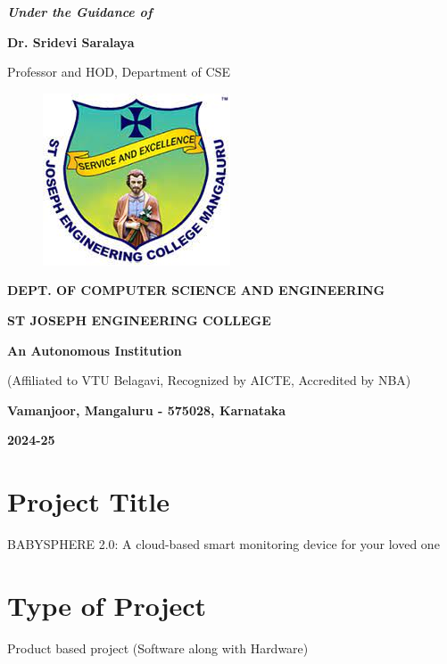 \documentclass[12pt,a4paper]{report}
\begin{document}
\begin{center}
\vspace{12pt}
\textit{\textbf{Under the Guidance of}}
\par
\vspace{6pt}
\textbf{Dr. Sridevi Saralaya}
\par
\vspace{2pt}
\normalsize { Professor and HOD, Department of CSE }
\par
\begin{figure}[hbtp]
\centering
\includegraphics[scale=0.6]{./pic/sjeclogo}
\end{figure}
\large \textbf{DEPT. OF COMPUTER SCIENCE AND ENGINEERING}
\par \Large \textbf{ST JOSEPH ENGINEERING COLLEGE}
\par 
\textbf{An Autonomous Institution}
\par
{\large{(Affiliated to VTU Belagavi, Recognized by AICTE, Accredited by NBA)}}
\par
\vspace{3pt}
{\large \textbf{Vamanjoor, Mangaluru - 575028, Karnataka}}
\par 
\vspace{12pt}
{\Large \textbf{2024-25}}
\end{center}
\newpage

\pagestyle{plain}

\section*{Project Title}
BABYSPHERE 2.0: A cloud-based smart monitoring device for your loved one

\section*{Type of Project}
Product based project (Software along with Hardware)
\end{document}
